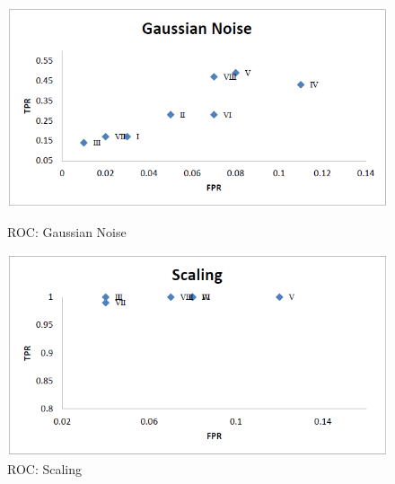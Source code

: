 \documentclass[12pt,a4paper]{jihmsp}
\begin{document}
{{\begin{figure}[h]
	\begin{multicols}{2}
		\includegraphics[width=\linewidth]{3gaussian.png}\par\caption{ROC: Gaussian Noise}
		\includegraphics[width=\linewidth]{4scaling.png}\par\caption{ROC: Scaling}
		
	\end{multicols}
\end{figure}

}}
\end{document}

